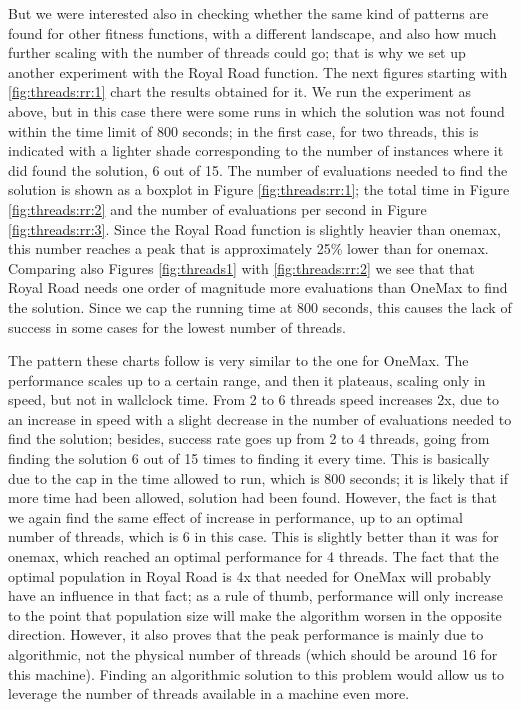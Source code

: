 \documentclass[runningheads]{llncs}\usepackage[]{graphicx}\usepackage[]{color}
\begin{document}
%
But we were interested also in checking whether the same kind of
patterns are found for other fitness functions, with a different
landscape, and also how much further scaling with the number of
threads could go; that is why we set up another experiment with the
Royal Road function. The next figures starting with \ref{fig:threads:rr:1} chart the results obtained for it. We run the experiment as above, but in this case there were
some runs in which the solution was not found within the time limit of
800 seconds; in the first case, for two threads, this is indicated
with a lighter shade corresponding to the number of instances where it
did found the solution, 6 out of 15. The number of evaluations needed
to find the solution is shown as a boxplot in Figure
\ref{fig:threads:rr:1}; the total time in Figure
\ref{fig:threads:rr:2} and the number of evaluations per second in
Figure \ref{fig:threads:rr:3}. Since the Royal Road function is
slightly heavier than onemax, this number reaches a peak that is
approximately 25\% lower than for onemax. Comparing also Figures
\ref{fig:threads1} with \ref{fig:threads:rr:2} we see that that Royal Road
needs one order of magnitude more evaluations than OneMax to find the
solution. Since we cap the running time at 800 seconds, this causes
the lack of success in some cases for the lowest number of threads.

The pattern these charts follow is very similar to the one for
OneMax. The performance scales up to a certain range, and then it
plateaus, scaling only in speed, but not in wallclock time. From 2 to
6 threads speed increases 2x, due to an increase in speed with a
slight decrease in the number of evaluations needed to find the
solution; besides, success rate goes up from 2 to 4 threads, going
from finding the solution 6 out of 15 times to finding it every
time. This is basically due to the cap in the time allowed to run,
which is 800 seconds; it is likely that if more time had been allowed,
solution had been found. However, the fact is that we again find the
same effect of increase in performance, up to an optimal number of
threads, which is 6 in this case. This is slightly better than it was
for onemax, which reached an optimal performance for 4 threads. The
fact that the optimal population in Royal Road is 4x that needed for
OneMax will probably have an influence in that fact; as a rule of
thumb, performance will only increase to the point that population
size will make the algorithm worsen in the opposite
direction. However, it also proves that the peak performance is mainly
due to algorithmic, not the physical number of threads (which should
be around 16 for this machine). Finding an algorithmic solution to
this problem would allow us to leverage the number of threads
available in a machine even more.
\end{document}
